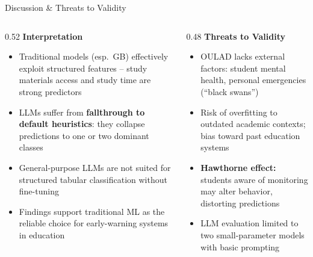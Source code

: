 \documentclass[aspectratio=169]{beamer}
\begin{document}
\begin{frame}{Discussion \& Threats to Validity}
\begin{columns}[T]
\begin{column}{0.52\textwidth}
\textbf{Interpretation}
\begin{itemize}
    \item Traditional models (esp.\ GB) effectively exploit structured features -- study materials access and study time are strong predictors
    \item LLMs suffer from \textbf{fallthrough to default heuristics}: they collapse predictions to one or two dominant classes
    \item General-purpose LLMs are not suited for structured tabular classification without fine-tuning
    \item Findings support traditional ML as the reliable choice for early-warning systems in education
\end{itemize}
\end{column}

\begin{column}{0.48\textwidth}
\textbf{Threats to Validity}
\begin{itemize}
    \item OULAD lacks external factors: student mental health, personal emergencies (``black swans'')
    \item Risk of overfitting to outdated academic contexts; bias toward past education systems
    \item \textbf{Hawthorne effect:} students aware of monitoring may alter behavior, distorting predictions
    \item LLM evaluation limited to two small-parameter models with basic prompting
\end{itemize}
\end{column}
\end{columns}
\end{frame}
\end{document}

